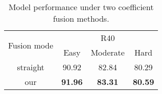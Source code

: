 

\begin{table}[h]
	\centering
	\caption{Model performance under two coefficient fusion methods.}
	\begin{tabular}{c|ccc} 
		\toprule
		\multirow{2}{*}{Fusion mode} & \multicolumn{3}{c}{R40}                           \\
		& Easy           & Moderate       & Hard            \\ 
		\hline
		straight                     & 90.92          & 82.84          & 80.29           \\
		our                          & \textbf{91.96} & \textbf{83.31} & \textbf{80.59}  \\
		\bottomrule
	\end{tabular}
\label{tabel6}
\end{table}
